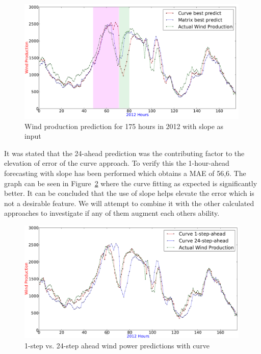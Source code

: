 \begin{figure}[H]
\centering
\includegraphics[width=0.99\textwidth]{billeder/curveAnalysisWindProduction.png}
\caption{Wind production prediction for 175 hours in 2012 with slope as input}
\label{fig:basicCurveAnalysisGrapho}
\end{figure} 

It was stated that the 24-ahead prediction was the contributing factor to the elevation of error of the curve approach. To verify this the 1-hour-ahead forecasting with slope has been performed which obtains a MAE of 56,6. The graph can be seen in Figure~\ref{fig:curveOneAheadvs24Ahead} where the curve fitting as expected is significantly better. It can be concluded that the use of slope helps elevate the error which is not a desirable feature. We will attempt to combine it with the other calculated approaches to investigate if any of them augment each others ability.

\begin{figure}[H]
\centering
\includegraphics[width=0.99\textwidth]{billeder/curveOneAheadvs24Ahead.png}
\caption{1-step vs. 24-step ahead wind power predictions with curve}
\label{fig:curveOneAheadvs24Ahead}
\end{figure}   

